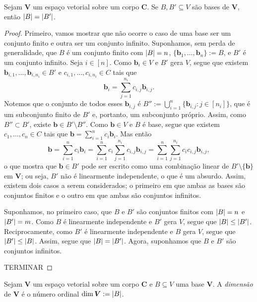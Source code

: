 \begin{theorem}
	Sejam $\bm V$ um espaço vetorial sobre um corpo $\bm C$. Se $B,B' \subseteq V$ são bases de $\bm V$, então $\left\lvert{B}\right\rvert = \left\lvert{B'}\right\rvert$.
\end{theorem}
\begin{proof}
	Primeiro, vamos mostrar que não ocorre o caso de uma base ser um conjunto finito e outra ser um conjunto infinito. Suponhamos, sem perda de generalidade, que $B$ é um conjunto finito com $\left\lvert{B}\right\rvert=n$, $\{\bm b_1,\ldots,\bm b_n\} := B$, e $B'$ é um conjunto infinito. Seja $i \in [n]$. Como $\bm b_i \in V$ e $B'$ gera $V$, segue que existem $\bm b_{i,1}, \ldots, \bm b_{i,n_i} \in B'$ e $c_{i,1}, \ldots, c_{i,n_i} \in C$ tais que
	\begin{equation*}
	\bm b_i = \sum_{j=1}^{n_i} c_{i,j} \bm b_{i,j}.
	\end{equation*}
Notemos que o conjunto de todos esses $\bm b_{i,j}$ é $B'' := \bigcup_{i=1}^n \{\bm b_{i,j} : j \in [n_i]\}$, que é um subconjunto finito de $B'$ e, portanto, um subconjunto próprio. Assim, como $B'' \subset B'$, existe $\bm b \in B' \setminus B''$. Como $\bm b \in V$ e $B$ é base, segue que existem $c_1, \ldots, c_n \in C$ tais que $\bm b = \sum_{i=1}^n c_i \bm b_i$. Mas então
	\begin{equation*}
	\bm b = \sum_{i=1}^n c_i \bm b_i = \sum _{i=1}^n c_i \sum_{j=1}^{n_i} c_{i,j} \bm b_{i,j} = \sum _{i=1}^n \sum_{j=1}^{n_i} c_ic_{i,j} \bm b_{i,j},
	\end{equation*}
o que mostra que $\bm b \in B'$ pode ser escrito como uma combinação linear de $B' \setminus \{\bm b\}$ em $\bm V$; ou seja, $B'$ não é linearmente independente, o que é um absurdo. Assim, existem dois casos a serem considerados; o primeiro em que ambas as bases são conjuntos finitos e o outro em que ambas são conjuntos infinitos.

	Suponhamos, no primeiro caso, que $B$ e $B'$ são conjuntos finitos com $\left\lvert{B}\right\rvert=n$ e $\left\lvert{B'}\right\rvert=m$. Como $B$ é linearmente independente e $B'$ gera $V$, segue que $\left\lvert{B}\right\rvert \leq \left\lvert{B'}\right\rvert$. Reciprocamente, como $B'$ é linearmente independente e $B$ gera $V$, segue que $\left\lvert{B'}\right\rvert \leq \left\lvert{B}\right\rvert$. Assim, segue que $\left\lvert{B}\right\rvert = \left\lvert{B'}\right\rvert$. Agora, suponhamos que $B$ e $B'$ são conjuntos infinitos.

TERMINAR
\end{proof}

\begin{definition}
	Sejam $\bm V$ um espaço vetorial sobre um corpo $\bm C$ e $B \subseteq V$ uma base $\bm V$. A \emph{dimensão} de $\bm V$ é o número ordinal
	$\dim \bm V := \left\lvert{B}\right\rvert$.
\end{definition}

